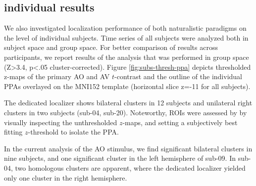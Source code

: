 \documentclass[english]{article}
\begin{document}
\subsection{individual results}
We also investigated localization performance of both naturalistic paradigms on
the level of individual subjects. 
Time series of all subjects were analyzed both in subject space and group space.
For better comparison of results across participants, we report results of the
analysis that was performed in group space (Z>3.4, p<.05 cluster-corrected).
Figure \ref{fig:subs-thresh-ppa} depicts thresholded z-maps of the primary AO
and AV $t$-contrast and the outline of the individual PPAs
\citep{sengupta2016extension} overlayed on the MNI152 template (horizontal slice
z=-11 for all subjects).


The dedicated localizer shows bilateral clusters in 12 subjects and unilateral
right clusters in two subjects (sub-04, sub-20).
Noteworthy, ROIs were assessed by \citep{sengupta2016extension} by visually
inspecting the unthresholded $z$-maps, and setting a subjectively best fitting
$z$-threshold to isolate the PPA.

In the current analysis of the AO stimulus, we find significant bilateral
clusters in nine subjects, and one significant cluster in the left hemisphere of sub-09.
In sub-04, two homologous clusters are apparent, where the dedicated localizer
yielded only one cluster in the right hemisphere.
\end{document}
